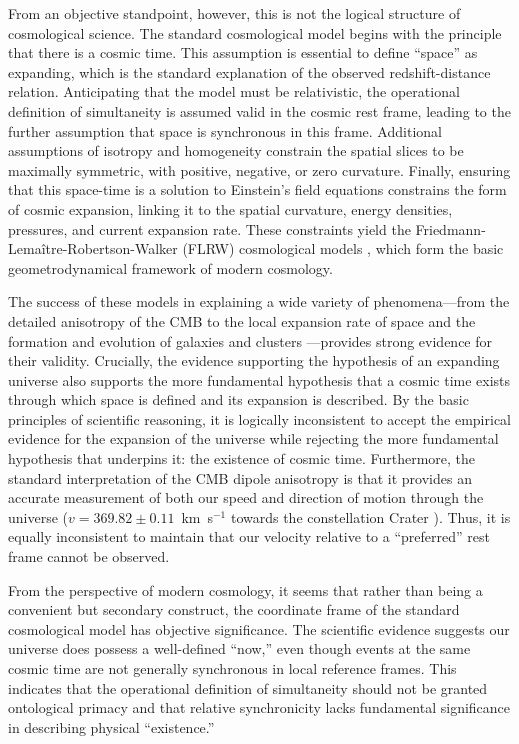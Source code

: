\documentclass[aps,rmp,groupedaddress,twocolumn,10pt]{revtex4-2}
\begin{document}
From an objective standpoint, however, this is not the logical structure of cosmological science. The standard cosmological model begins with the principle that there is a cosmic time. This assumption is essential to define ``space'' as expanding, which is the standard explanation of the observed redshift-distance relation. Anticipating that the model must be relativistic, the operational definition of simultaneity is assumed valid in the cosmic rest frame, leading to the further assumption that space is synchronous in this frame. Additional assumptions of isotropy and homogeneity constrain the spatial slices to be maximally symmetric, with positive, negative, or zero curvature. Finally, ensuring that this space-time is a solution to Einstein's field equations constrains the form of cosmic expansion, linking it to the spatial curvature, energy densities, pressures, and current expansion rate. These constraints yield the Friedmann-Lemaître-Robertson-Walker (FLRW) cosmological models \cite{Friedmann1922,Friedmann1924,Lemaitre1927,Lemaitre1931a,Lemaitre1931b,Lemaitre1931c,Robertson1936a,Robertson1936b,Walker1935a,Walker1935b}, which form the basic geometrodynamical framework of modern cosmology.

The success of these models in explaining a wide variety of phenomena---from the detailed anisotropy of the CMB \cite{Aghanim2020} to the local expansion rate of space \cite{Freedman2017,Freedman2023,Riess2024} and the formation and evolution of galaxies and clusters \cite{Springel2005,Springel2006,Haslbauer2022}---provides strong evidence for their validity. Crucially, the evidence supporting the hypothesis of an expanding universe also supports the more fundamental hypothesis that a cosmic time exists through which space is defined and its expansion is described. By the basic principles of scientific reasoning, it is logically inconsistent to accept the empirical evidence for the expansion of the universe while rejecting the more fundamental hypothesis that underpins it: the existence of cosmic time. Furthermore, the standard interpretation of the CMB dipole anisotropy is that it provides an accurate measurement of both our speed and direction of motion through the universe ($v=369.82\pm0.11$~km~s$^{-1}$ towards the constellation Crater \cite{Aghanim2020a}). Thus, it is equally inconsistent to maintain that our velocity relative to a ``preferred'' rest frame cannot be observed.

From the perspective of modern cosmology, it seems that rather than being a convenient but secondary construct, the coordinate frame of the standard cosmological model has objective significance. The scientific evidence suggests our universe does possess a well-defined ``now,'' even though events at the same cosmic time are not generally synchronous in local reference frames. This indicates that the operational definition of simultaneity should not be granted ontological primacy and that relative synchronicity lacks fundamental significance in describing physical ``existence.''
\end{document}
